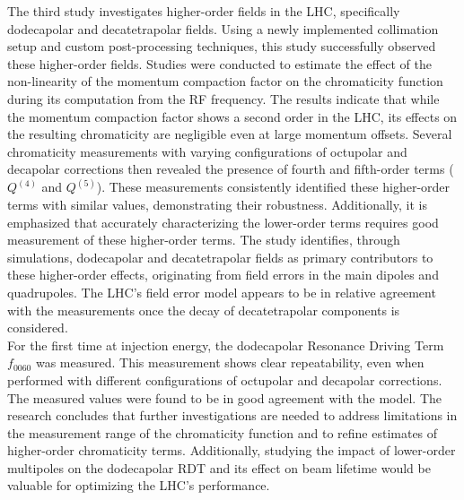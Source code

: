 {%
The third study investigates higher-order fields in the LHC, specifically dodecapolar and
decatetrapolar fields. Using a newly implemented collimation setup and custom post-processing
techniques, this study successfully observed these higher-order fields. Studies were conducted to
estimate the effect of the non-linearity of the momentum compaction factor on the chromaticity
function during its computation from the RF frequency. The results indicate that while the momentum
compaction factor shows a second order in the LHC, its effects on the resulting chromaticity are
negligible even at large momentum offsets. Several chromaticity measurements with varying
configurations of octupolar and decapolar corrections then revealed the presence of fourth and
fifth-order terms ($Q^{(4)}$ and $Q^{(5)}$). These measurements consistently identified these
higher-order terms with similar values, demonstrating their robustness. Additionally, it is
emphasized that accurately characterizing the lower-order terms requires good measurement of these
higher-order terms. The study identifies, through simulations, dodecapolar and decatetrapolar fields
as primary contributors to these higher-order effects, originating from field errors in the main
dipoles and quadrupoles. The LHC's field error model appears to be in relative agreement with the
measurements once the decay of decatetrapolar components is considered. \\
\indent
For the first time at injection energy, the dodecapolar Resonance Driving Term $f_{0060}$ was
measured. This measurement shows clear repeatability, even when performed with different
configurations of octupolar and decapolar corrections. The measured values were found to be in good
agreement with the model. The research concludes that further investigations are needed to address
limitations in the measurement range of the chromaticity function and to refine estimates of
higher-order chromaticity terms. Additionally, studying the impact of lower-order multipoles on the
dodecapolar RDT and its effect on beam lifetime would be valuable for optimizing the LHC's
performance.

}
